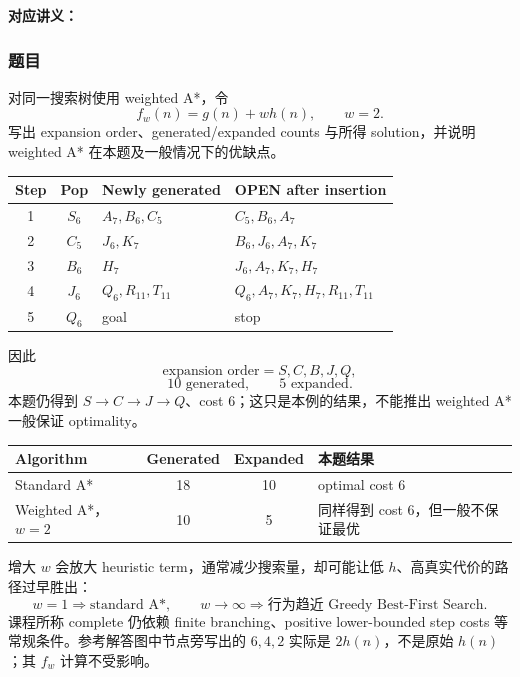 \textbf{对应讲义：}

\subsubsection*{题目}

对同一搜索树使用 weighted A*，令
\[
  f_w(n)=g(n)+w h(n),\qquad w=2.
\]
写出 expansion order、generated/expanded counts 与所得 solution，并说明 weighted A* 在本题及一般情况下的优缺点。

\begin{checkedsolution}
\begin{center}
\small
\begin{tabularx}{0.94\textwidth}{@{}cclX@{}}
  \toprule
  Step & Pop & Newly generated & OPEN after insertion \\
  \midrule
  1 & $S_6$ & $A_7,B_6,C_5$ & $C_5,B_6,A_7$ \\
  2 & $C_5$ & $J_6,K_7$ & $B_6,J_6,A_7,K_7$ \\
  3 & $B_6$ & $H_7$ & $J_6,A_7,K_7,H_7$ \\
  4 & $J_6$ & $Q_6,R_{11},T_{11}$ & $Q_6,A_7,K_7,H_7,R_{11},T_{11}$ \\
  5 & $Q_6$ & goal & stop \\
  \bottomrule
\end{tabularx}
\end{center}

因此
\[
  \boxed{\text{expansion order}=S,C,B,J,Q},
\]
\[
  \boxed{10\text{ generated}},
  \qquad
  \boxed{5\text{ expanded}}.
\]
本题仍得到 $S\to C\to J\to Q$、cost $6$；这只是本例的结果，不能推出 weighted A* 一般保证 optimality。

\begin{center}
\small
\begin{tabularx}{0.92\textwidth}{@{}lccX@{}}
  \toprule
  Algorithm & Generated & Expanded & 本题结果 \\
  \midrule
  Standard A* & 18 & 10 & optimal cost $6$ \\
  Weighted A*，$w=2$ & 10 & 5 & 同样得到 cost $6$，但一般不保证最优 \\
  \bottomrule
\end{tabularx}
\end{center}

增大 $w$ 会放大 heuristic term，通常减少搜索量，却可能让低 $h$、高真实代价的路径过早胜出：
\[
  w=1\Rightarrow\text{standard A*},
  \qquad
  w\to\infty\Rightarrow\text{行为趋近 Greedy Best-First Search}.
\]
课程所称 complete 仍依赖 finite branching、positive lower-bounded step costs 等常规条件。参考解答图中节点旁写出的 $6,4,2$ 实际是 $2h(n)$，不是原始 $h(n)$；其 $f_w$ 计算不受影响。
\end{checkedsolution}

